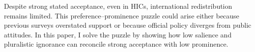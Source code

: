\documentclass[12pt,english]{article}
\begin{document}
Despite strong stated acceptance, even in HICs, international redistribution remains limited. 
This preference--prominence puzzle could arise either because previous surveys overstated support or because official policy diverges from public attitudes. %
In this paper, I solve the puzzle by showing how low salience and pluralistic ignorance can reconcile strong acceptance with low prominence. 
\end{document}
